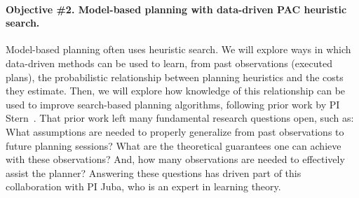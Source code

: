\documentclass[12pt]{article}
\newcommand{\note}[1]{\textbf{\textit{#1}}}
\begin{document}
\vspace{-0.35cm}
\paragraph{Objective \#2. Model-based planning with data-driven PAC heuristic search.}
Model-based planning often uses heuristic search. We will explore ways in which data-driven methods can be used to learn, from past observations (executed plans), the probabilistic relationship between planning heuristics and the costs they estimate. Then, we will explore how knowledge of this relationship can be used to improve search-based planning algorithms, following prior work by PI Stern~\cite{stern2011probably,stern2012exploring,stern2014potential}.
That prior work left many fundamental research questions open, such as: What assumptions are needed to properly generalize from past observations to future planning sessions? What are the theoretical guarantees one can achieve with these observations? And, how many observations are needed to effectively assist the planner? Answering these questions has driven part of this collaboration with PI Juba, who is an expert in learning theory. 




\end{document}
